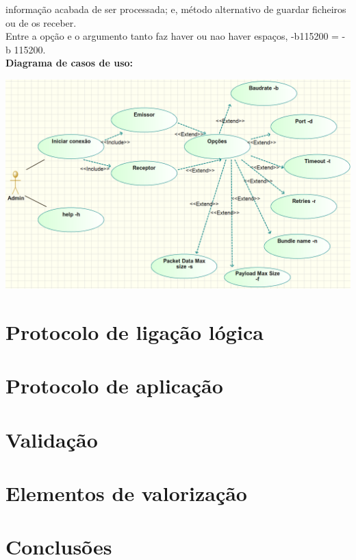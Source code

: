 \documentclass[a4paper]{article}
\begin{document}
informação acabada de ser processada; e, método alternativo de guardar
ficheiros ou de os receber.\\Entre a opção e o argumento tanto faz haver
ou nao haver espaços, -b115200 = -b 115200.
\\\newline\textbf{Diagrama de casos de uso:}\\\newline
\centerline{\includegraphics[scale=0.6]{useCases.png}}

\section{Protocolo de ligação lógica}

\section{Protocolo de aplicação}

\section{Validação}

\section{Elementos de valorização}

\section{Conclusões}
\end{document}

